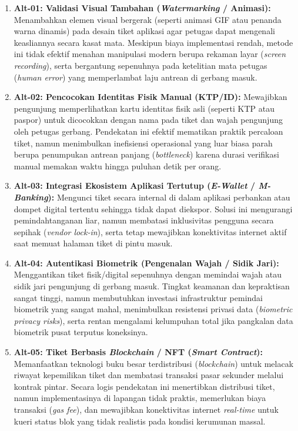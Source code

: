 \begin{enumerate}
    \item \textbf{Alt-01: Validasi Visual Tambahan (\textit{Watermarking} / Animasi):} Menambahkan elemen visual bergerak (seperti animasi GIF atau penanda warna dinamis) pada desain tiket aplikasi agar petugas dapat mengenali keasliannya secara kasat mata. Meskipun biaya implementasi rendah, metode ini tidak efektif menahan manipulasi modern berupa rekaman layar (\textit{screen recording}), serta bergantung sepenuhnya pada ketelitian mata petugas (\textit{human error}) yang memperlambat laju antrean di gerbang masuk.
    
    \item \textbf{Alt-02: Pencocokan Identitas Fisik Manual (KTP/ID):} Mewajibkan pengunjung memperlihatkan kartu identitas fisik asli (seperti KTP atau paspor) untuk dicocokkan dengan nama pada tiket dan wajah pengunjung oleh petugas gerbang. Pendekatan ini efektif mematikan praktik percaloan tiket, namun menimbulkan inefisiensi operasional yang luar biasa parah berupa penumpukan antrean panjang (\textit{bottleneck}) karena durasi verifikasi manual memakan waktu hingga puluhan detik per orang.
    
    \item \textbf{Alt-03: Integrasi Ekosistem Aplikasi Tertutup (\textit{E-Wallet} / \textit{M-Banking}):} Mengunci tiket secara internal di dalam aplikasi perbankan atau dompet digital tertentu sehingga tidak dapat diekspor. Solusi ini mengurangi pemindahtanganan liar, namun membatasi inklusivitas pengguna secara sepihak (\textit{vendor lock-in}), serta tetap mewajibkan konektivitas internet aktif saat memuat halaman tiket di pintu masuk.
    
    \item \textbf{Alt-04: Autentikasi Biometrik (Pengenalan Wajah / Sidik Jari):} Menggantikan tiket fisik/digital sepenuhnya dengan memindai wajah atau sidik jari pengunjung di gerbang masuk. Tingkat keamanan dan kepraktisan sangat tinggi, namun membutuhkan investasi infrastruktur pemindai biometrik yang sangat mahal, menimbulkan resistensi privasi data (\textit{biometric privacy risks}), serta rentan mengalami kelumpuhan total jika pangkalan data biometrik pusat terputus koneksinya.
    
    \item \textbf{Alt-05: Tiket Berbasis \textit{Blockchain} / NFT (\textit{Smart Contract}):} Memanfaatkan teknologi buku besar terdistribusi (\textit{blockchain}) untuk melacak riwayat kepemilikan tiket dan membatasi transaksi pasar sekunder melalui kontrak pintar. Secara logis pendekatan ini menertibkan distribusi tiket, namun implementasinya di lapangan tidak praktis, memerlukan biaya transaksi (\textit{gas fee}), dan mewajibkan konektivitas internet \textit{real-time} untuk kueri status blok yang tidak realistis pada kondisi kerumunan massal.
    

\end{enumerate}
